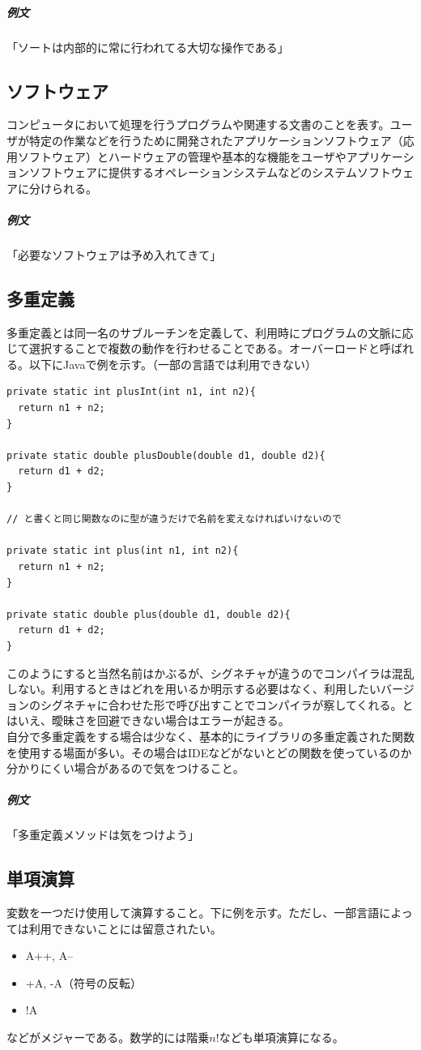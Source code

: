\documentclass[dvipdfmx,jb5]{jreport}
\begin{document}
\subparagraph{例文}「ソートは内部的に常に行われてる大切な操作である」

\subsection{ソフトウェア}
コンピュータにおいて処理を行うプログラムや関連する文書のことを表す。ユーザが特定の作業などを行うために開発されたアプリケーションソフトウェア（応用ソフトウェア）とハードウェアの管理や基本的な機能をユーザやアプリケーションソフトウェアに提供するオペレーションシステムなどのシステムソフトウェアに分けられる。

\subparagraph{例文}「必要なソフトウェアは予め入れてきて」

\subsection{多重定義}
多重定義とは同一名のサブルーチンを定義して、利用時にプログラムの文脈に応じて選択することで複数の動作を行わせることである。オーバーロードと呼ばれる。以下にJavaで例を示す。（一部の言語では利用できない）

\lstset{language=Java}
\begin{lstlisting}
private static int plusInt(int n1, int n2){
  return n1 + n2;
}

private static double plusDouble(double d1, double d2){
  return d1 + d2;
}

// と書くと同じ関数なのに型が違うだけで名前を変えなければいけないので

private static int plus(int n1, int n2){
  return n1 + n2;
}

private static double plus(double d1, double d2){
  return d1 + d2;
}
\end{lstlisting}
このようにすると当然名前はかぶるが、シグネチャが違うのでコンパイラは混乱しない。利用するときはどれを用いるか明示する必要はなく、利用したいバージョンのシグネチャに合わせた形で呼び出すことでコンパイラが察してくれる。とはいえ、曖昧さを回避できない場合はエラーが起きる。
\\

自分で多重定義をする場合は少なく、基本的にライブラリの多重定義された関数を使用する場面が多い。その場合はIDEなどがないとどの関数を使っているのか分かりにくい場合があるので気をつけること。

\subparagraph{例文}「多重定義メソッドは気をつけよう」

\subsection{単項演算}
変数を一つだけ使用して演算すること。下に例を示す。ただし、一部言語によっては利用できないことには留意されたい。
\begin{itemize}
      \item A++, A--
      \item +A, -A（符号の反転）
      \item !A
\end{itemize}
などがメジャーである。数学的には階乗$n!$なども単項演算になる。
\end{document}

